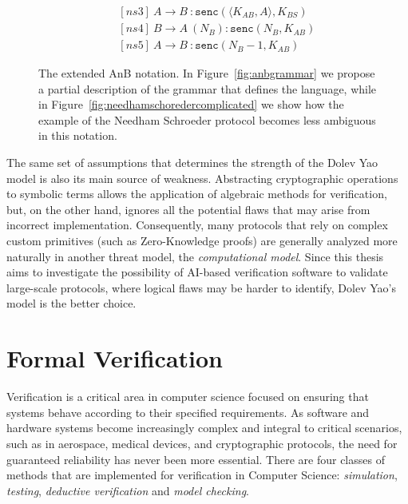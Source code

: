 \begin{figure}[htbp]
\begin{minipage}{0.8\textwidth}
{\begin{align*}
            &\ \ \ \ [ns3] \ A \to B \ : \texttt{senc}(\langle K_{AB}, A \rangle, K_{BS})\\
            &\ \ \ \ [ns4] \ B \to A \ (N_B) : \texttt{senc}(N_B, K_{AB})\\
            &\ \ \ \ [ns5] \ A \to B \ :\texttt{senc}(N_B - 1, K_{AB})
        \end{align*}}
        \label{fig:needhamschoredercomplicated}
    \end{minipage}
    \caption{The extended AnB notation. In Figure~\ref{fig:anbgrammar} we propose a partial description of the grammar that defines the language, while in Figure~\ref{fig:needhamschoredercomplicated} we show how the example of the Needham Schroeder protocol becomes less ambiguous in this notation.}
    \label{fig:anbgrammarexample}
\end{figure}

The same set of assumptions that determines the strength of the Dolev Yao model is also its main source of weakness. Abstracting cryptographic operations to symbolic terms allows the application of algebraic methods for verification, but, on the other hand, ignores all the potential flaws that may arise from incorrect implementation. Consequently, many protocols that rely on complex custom primitives (such as Zero-Knowledge proofs) are generally analyzed more naturally in another threat model, the \textit{computational model}. Since this thesis aims to investigate the possibility of AI-based verification software to validate large-scale protocols, where logical flaws may be harder to identify, Dolev Yao's model is the better choice.

\clearpage

\section{Formal Verification}
\label{sec:formalverification}
Verification is a critical area in computer science focused on ensuring that systems behave according to their specified requirements. As software and hardware systems become increasingly complex and integral to critical scenarios, such as in aerospace, medical devices, and cryptographic protocols, the need for guaranteed reliability has never been more essential. There are four classes of methods that are implemented for verification in Computer Science: \textit{simulation}, \textit{testing}, \textit{deductive verification} and \textit{model checking}.

